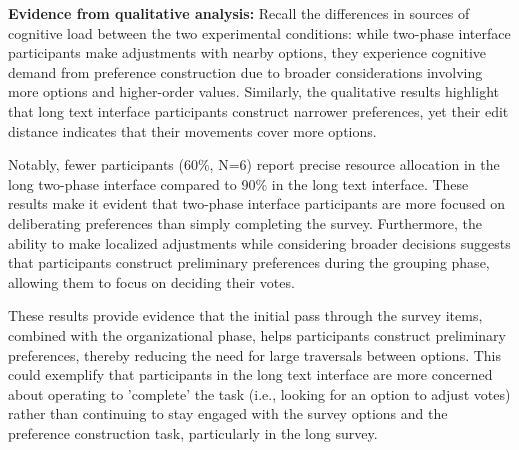 \textbf{Evidence from qualitative analysis:} Recall the differences in sources of cognitive load between the two experimental conditions: while two-phase interface participants make adjustments with nearby options, they experience cognitive demand from preference construction due to broader considerations involving more options and higher-order values. Similarly, the qualitative results highlight that long text interface participants construct narrower preferences, yet their edit distance indicates that their movements cover more options.

Notably, fewer participants (60\%, N=6) report precise resource allocation in the long two-phase interface compared to 90\% in the long text interface. These results make it evident that two-phase interface participants are more focused on deliberating preferences than simply completing the survey. Furthermore, the ability to make localized adjustments while considering broader decisions suggests that participants construct preliminary preferences during the grouping phase, allowing them to focus on deciding their votes.

These results provide evidence that the initial pass through the survey items, combined with the organizational phase, helps participants construct preliminary preferences, thereby reducing the need for large traversals between options. This could exemplify that participants in the long text interface are more concerned about operating to 'complete' the task (i.e., looking for an option to adjust votes) rather than continuing to stay engaged with the survey options and the preference construction task, particularly in the long survey.



